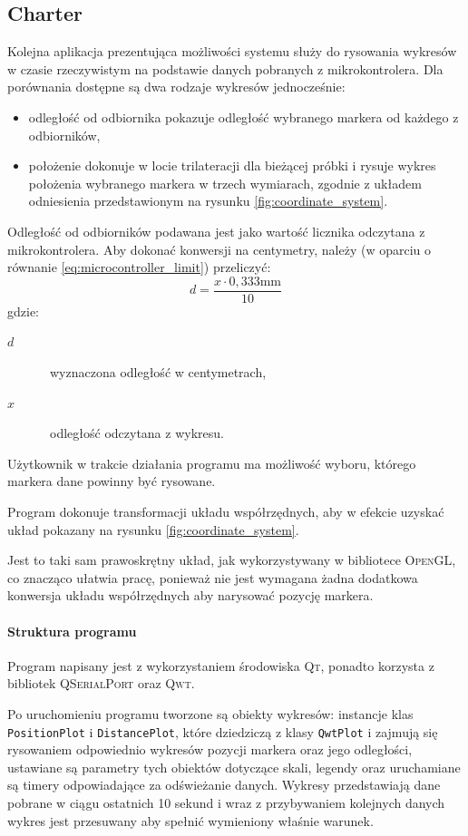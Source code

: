 \subsection{Charter}
Kolejna aplikacja prezentująca możliwości systemu służy do rysowania wykresów w czasie rzeczywistym na podstawie danych pobranych z mikrokontrolera. Dla porównania dostępne są dwa rodzaje wykresów jednocześnie:
\begin{itemize}
 \item odległość od odbiornika \ppauza pokazuje odległość wybranego markera od każdego z odbiorników,
 \item położenie \ppauza dokonuje w locie trilateracji dla bieżącej próbki i rysuje wykres położenia wybranego markera w trzech wymiarach, zgodnie z układem odniesienia przedstawionym na rysunku \ref{fig:coordinate_system}.
\end{itemize}

Odległość od odbiorników podawana jest jako wartość licznika odczytana z mikrokontrolera. Aby dokonać konwersji na centymetry, należy (w oparciu o równanie \ref{eq:microcontroller_limit}) przeliczyć:
\begin{equation}
 d = \frac{x \cdot 0,333\textrm{mm}}{10}
\end{equation}
gdzie:
\begin{description}
 \item[$d$] \ppauza~wyznaczona odległość w centymetrach,
 \item[$x$] \ppauza~odległość odczytana z wykresu.
\end{description}

Użytkownik w trakcie działania programu ma możliwość wyboru, którego markera dane powinny być rysowane.

Program dokonuje transformacji układu współrzędnych, aby w efekcie uzyskać układ pokazany na rysunku \ref{fig:coordinate_system}.

Jest to taki sam prawoskrętny układ, jak wykorzystywany w bibliotece \textsc{OpenGL}, co znacząco ułatwia pracę, ponieważ nie jest wymagana żadna dodatkowa konwersja układu współrzędnych aby narysować pozycję markera.

\paragraph{Struktura programu}
Program napisany jest z wykorzystaniem środowiska \textsc{Qt}, ponadto korzysta z bibliotek \textsc{QSerialPort} oraz \textsc{Qwt}.

Po uruchomieniu programu tworzone są obiekty wykresów: instancje klas \verb|PositionPlot| i \verb|DistancePlot|, które dziedziczą z klasy \verb|QwtPlot| i zajmują się rysowaniem odpowiednio wykresów pozycji markera oraz jego odległości, ustawiane są parametry tych obiektów dotyczące skali, legendy oraz uruchamiane są timery odpowiadające za odświeżanie danych. Wykresy przedstawiają dane pobrane w ciągu ostatnich 10 sekund i wraz z przybywaniem kolejnych danych wykres jest przesuwany aby spełnić wymieniony właśnie warunek.

